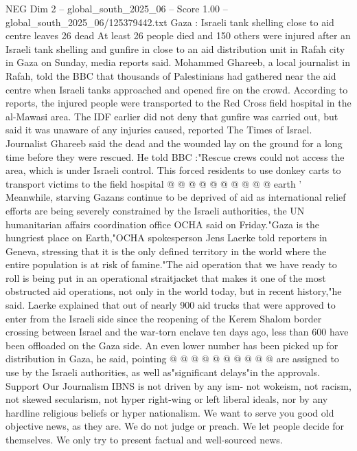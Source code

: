 \begin{textsample}{NEG Dim 2 – global\_south\_2025\_06 – Score 1.00 – global\_south\_2025\_06/125379442.txt}  \label{ex:f2_neg_203}
Gaza : Israeli tank shelling close to aid centre leaves 26 dead At least 26 people died and 150 others were injured after an Israeli tank shelling and gunfire in close to an aid distribution unit in Rafah city in Gaza on Sunday, media reports said.
Mohammed Ghareeb, a local journalist in Rafah, told the BBC that thousands of Palestinians had gathered near the aid centre when Israeli tanks approached and opened fire on the crowd.
According to reports, the injured people were transported to the Red Cross field hospital in the al-Mawasi area.
The IDF earlier did not deny that gunfire was carried out, but said it was unaware of any injuries caused, reported The Times of Israel.
Journalist Ghareeb said the dead and the wounded lay on the ground for a long time before they were rescued.
He told BBC :"Rescue crews could not access the area, which is under Israeli control.
This forced residents to use donkey carts to transport victims to the field hospital @ @ @ @ @ @ @ @ @ @ earth ' Meanwhile, starving Gazans continue to be deprived of aid as international relief efforts are being severely constrained by the Israeli authorities, the UN humanitarian affairs coordination office OCHA said on Friday."Gaza is the hungriest place on Earth,"OCHA spokesperson Jens Laerke told reporters in Geneva, stressing that it is the only defined territory in the world where the entire population is at risk of famine."The aid operation that we have ready to roll is being put in an operational straitjacket that makes it one of the most obstructed aid operations, not only in the world today, but in recent history,"he said.
Laerke explained that out of nearly 900 aid trucks that were approved to enter from the Israeli side since the reopening of the Kerem Shalom border crossing between Israel and the war-torn enclave ten days ago, less than 600 have been offloaded on the Gaza side.
An even lower number has been picked up for distribution in Gaza, he said, pointing @ @ @ @ @ @ @ @ @ @ are assigned to use by the Israeli authorities, as well as"significant delays"in the approvals.
Support Our Journalism IBNS is not driven by any ism- not wokeism, not racism, not skewed secularism, not hyper right-wing or left liberal ideals, nor by any hardline religious beliefs or hyper nationalism.
We want to serve you good old objective news, as they are.
We do not judge or preach.
We let people decide for themselves.
We only try to present factual and well-sourced news.

\end{textsample}
